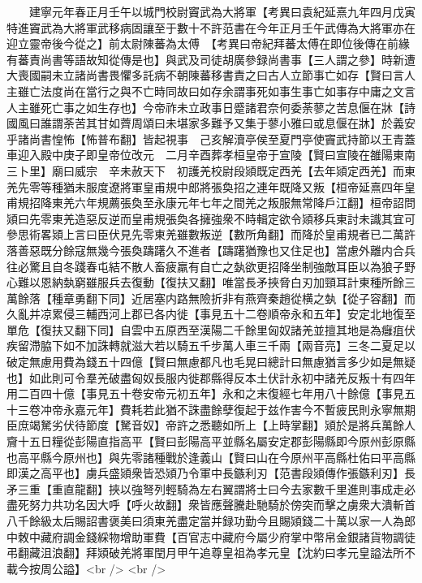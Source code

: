 　　建寧元年春正月壬午以城門校尉竇武為大將軍【考異曰袁紀延熹九年四月戊寅特進竇武為大將軍武移病固讓至于數十不許范書在今年正月壬午武傳為大將軍亦在迎立靈帝後今從之】前太尉陳蕃為太傅　【考異曰帝紀拜蕃太傅在即位後傳在前緣有蕃責尚書等語故知從傳是也】與武及司徒胡廣參録尚書事【三人謂之參】時新遭大喪國嗣未立諸尚書畏懼多託病不朝陳蕃移書責之曰古人立節事亡如存【賢曰言人主雖亡法度尚在當行之與不亡時同故曰如存余謂事死如事生事亡如事存中庸之文言人主雖死亡事之如生存也】今帝祚未立政事日蹙諸君奈何委荼蓼之苦息偃在牀【詩國風曰誰謂荼苦其甘如薺周頌曰未堪家多難予又集于蓼小雅曰或息偃在牀】於義安乎諸尚書惶怖【怖普布翻】皆起視事　己亥解瀆亭侯至夏門亭使竇武持節以王青蓋車迎入殿中庚子即皇帝位改元　二月辛酉葬孝桓皇帝于宣陵【賢曰宣陵在雒陽東南三卜里】廟曰威宗　辛未赦天下　初護羌校尉段熲既定西羌【去年熲定西羌】而東羌先零等種猶未服度遼將軍皇甫規中郎將張奐招之連年既降又叛【桓帝延熹四年皇甫規招降東羌六年規薦張奐至永康元年七年之間羌之叛服無常降戶江翻】桓帝詔問熲曰先零東羌造惡反逆而皇甫規張奐各擁強衆不時輯定欲令熲移兵東討未識其宜可參思術畧熲上言曰臣伏見先零東羌雖數叛逆【數所角翻】而降於皇甫規者已二萬許落善惡既分餘寇無幾今張奐躊躇久不進者【躊躇猶豫也又住足也】當慮外離内合兵往必驚且自冬踐春屯結不散人畜疲羸有自亡之埶欲更招降坐制強敵耳臣以為狼子野心難以恩納埶窮雖服兵去復動【復扶又翻】唯當長矛挾脅白刃加頸耳計東種所餘三萬餘落【種章勇翻下同】近居塞内路無險折非有燕齊秦趙從横之埶【從子容翻】而久亂并凉累侵三輔西河上郡已各内徙【事見五十二卷順帝永和五年】安定北地復至單危【復扶又翻下同】自雲中五原西至漢陽二千餘里匈奴諸羌並擅其地是為癰疽伏疾留滯脇下如不加誅轉就滋大若以騎五千步萬人車三千兩【兩音亮】三冬二夏足以破定無慮用費為錢五十四億【賢曰無慮都凡也毛晃曰總計曰無慮猶言多少如是無疑也】如此則可令羣羌破盡匈奴長服内徙郡縣得反本土伏計永初中諸羌反叛十有四年用二百四十億【事見五十卷安帝元初五年】永和之末復經七年用八十餘億【事見五十三卷冲帝永嘉元年】費耗若此猶不誅盡餘孽復起于兹作害今不暫疲民則永寧無期臣庶竭駑劣伏待節度【駑音奴】帝許之悉聽如所上【上時掌翻】熲於是將兵萬餘人齎十五日糧從彭陽直指高平【賢曰彭陽高平並縣名屬安定郡彭陽縣即今原州彭原縣也高平縣今原州也】與先零諸種戰於逢義山【賢曰山在今原州平高縣杜佑曰平高縣即漢之高平也】虜兵盛熲衆皆恐熲乃令軍中長鏃利刃【范書段熲傳作張鏃利刃】長矛三重【重直龍翻】挾以強弩列輕騎為左右翼謂將士曰今去家數千里進則事成走必盡死努力共功名因大呼【呼火故翻】衆皆應聲騰赴馳騎於傍突而擊之虜衆大潰斬首八千餘級太后賜詔書褒美曰須東羌盡定當并録功勤今且賜熲錢二十萬以家一人為郎中敇中藏府調金錢綵物增助軍費【百官志中藏府今屬少府掌中幣帛金銀諸貨物調徒弔翻藏沮浪翻】拜熲破羌將軍閏月甲午追尊皇祖為孝元皇【沈約曰孝元皇謚法所不載今按周公謚】<br />
<br />

